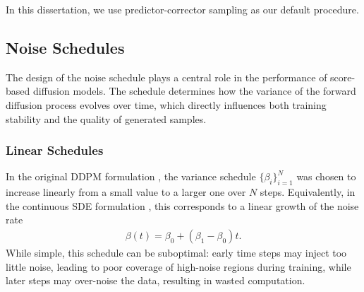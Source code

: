 \documentclass[a4paper,12pt]{article}
\begin{document}
In this dissertation, we use predictor-corrector sampling as our default procedure.

\subsection{Noise Schedules}
The design of the noise schedule plays a central role in the performance of score-based diffusion models. 
The schedule determines how the variance of the forward diffusion process evolves over time, which directly influences both training stability and the quality of generated samples.

\subsubsection{Linear Schedules}
In the original DDPM formulation \citep{hoDenoisingDiffusionProbabilistic2020}, the variance schedule \(\{\beta_i\}_{i=1}^N\) was chosen to increase linearly from a small value to a larger one over \(N\) steps. Equivalently, in the continuous SDE formulation \citep{song2021ScoreBasedGenerativeModeling}, this corresponds to a linear growth of the noise rate
\begin{align*}
    \beta\!\left(t\right)=\beta_0+\left(\beta_1-\beta_0\right)t.
\end{align*}
While simple, this schedule can be suboptimal: early time steps may inject too little noise, leading to poor coverage of high-noise regions during training, while later steps may over-noise the data, resulting in wasted computation.
\end{document}
